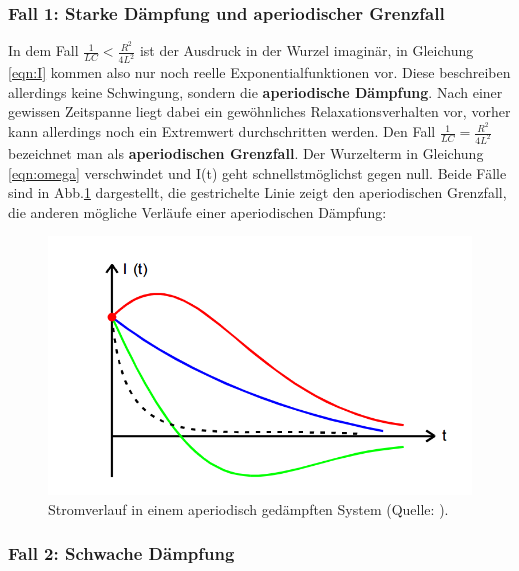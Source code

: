 \subsubsection{Fall 1: Starke Dämpfung und aperiodischer Grenzfall}
In dem Fall $\frac{1}{LC}<\frac{R^2}{4L^2}$ ist der Ausdruck in der
Wurzel imaginär, in Gleichung
\ref{eqn:I} kommen also nur noch reelle Exponentialfunktionen vor. Diese
beschreiben allerdings keine Schwingung, sondern die
\textbf{aperiodische Dämpfung}. Nach einer gewissen Zeitspanne liegt dabei ein
gewöhnliches Relaxationsverhalten vor, vorher kann allerdings noch ein Extremwert
durchschritten werden.
Den Fall $\frac{1}{LC}=\frac{R^2}{4L^2}$ bezeichnet man als
\textbf{aperiodischen Grenzfall}. Der Wurzelterm in Gleichung \ref{eqn:omega}
verschwindet und I(t) geht schnellstmöglichst gegen null.
Beide Fälle sind in Abb.\ref{fig:aper} dargestellt, die gestrichelte Linie zeigt
den aperiodischen Grenzfall, die anderen mögliche Verläufe einer aperiodischen
Dämpfung:
\begin{figure}
  \centering
  \includegraphics{aperiode.png}
  \caption{Stromverlauf in einem aperiodisch gedämpften System
  (Quelle: \cite{officialmanual}).}
  \label{fig:aper}
\end{figure}

\subsubsection{Fall 2: Schwache Dämpfung}

